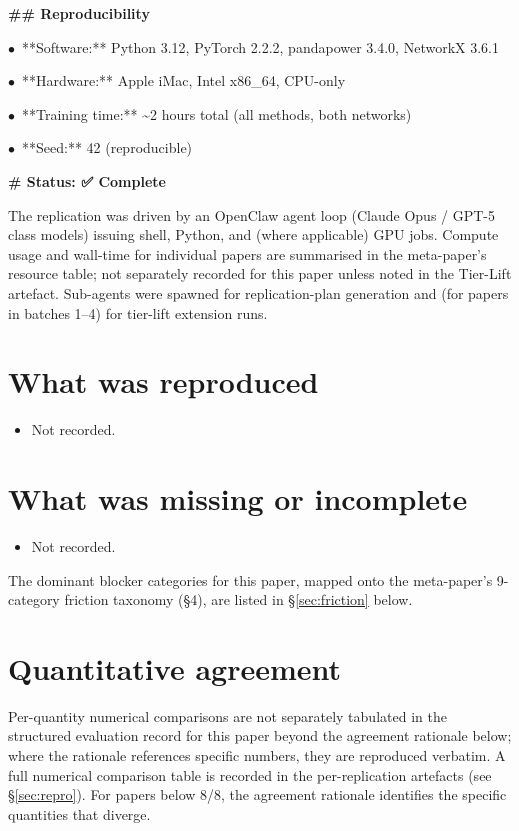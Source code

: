 \documentclass[11pt]{article}
\begin{document}
\par\medskip\textbf{\#\# Reproducibility}\par
\par$\bullet$\ **Software:** Python 3.12, PyTorch 2.2.2, pandapower 3.4.0, NetworkX 3.6.1
\par$\bullet$\ **Hardware:** Apple iMac, Intel x86\_64, CPU-only
\par$\bullet$\ **Training time:** \textasciitilde{}2 hours total (all methods, both networks)
\par$\bullet$\ **Seed:** 42 (reproducible)

\par\medskip\textbf{\# Status: ✅ Complete}\par
\normalsize

The replication was driven by an OpenClaw agent loop (Claude Opus / GPT-5 class models) issuing shell, Python, and (where applicable) GPU jobs. Compute usage and wall-time for individual papers are summarised in the meta-paper's resource table; not separately recorded for this paper unless noted in the Tier-Lift artefact. Sub-agents were spawned for replication-plan generation and (for papers in batches 1--4) for tier-lift extension runs.

\section{What was reproduced}
\begin{itemize}
\item Not recorded.
\end{itemize}

\section{What was missing or incomplete}
\begin{itemize}
\item Not recorded.
\end{itemize}
The dominant blocker categories for this paper, mapped onto the meta-paper's 9-category friction taxonomy (\S4), are listed in \S\ref{sec:friction} below.

\section{Quantitative agreement}
Per-quantity numerical comparisons are not separately tabulated in the structured evaluation record for this paper beyond the agreement rationale below; where the rationale references specific numbers, they are reproduced verbatim. A full numerical comparison table is recorded in the per-replication artefacts (see \S\ref{sec:repro}). For papers below 8/8, the agreement rationale identifies the specific quantities that diverge.
\end{document}
